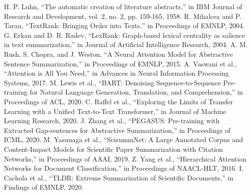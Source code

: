 \documentclass[conference]{IEEEtran}
\begin{document}
\begin{thebibliography}{00}
 H. P. Luhn, ``The automatic creation of literature abstracts,'' in IBM Journal of Research and Development, vol. 2, no. 2, pp. 159-165, 1958.
 R. Mihalcea and P. Tarau, ``TextRank: Bringing Order into Texts,'' in Proceedings of EMNLP, 2004.
 G. Erkan and D. R. Radev, ``LexRank: Graph-based lexical centrality as salience in text summarization,'' in Journal of Artificial Intelligence Research, 2004.
 A. M. Rush, S. Chopra, and J. Weston, ``A Neural Attention Model for Abstractive Sentence Summarization,'' in Proceedings of EMNLP, 2015.
 A. Vaswani et al., ``Attention is All You Need,'' in Advances in Neural Information Processing Systems, 2017.
 M. Lewis et al., ``BART: Denoising Sequence-to-Sequence Pre-training for Natural Language Generation, Translation, and Comprehension,'' in Proceedings of ACL, 2020.
 C. Raffel et al., ``Exploring the Limits of Transfer Learning with a Unified Text-to-Text Transformer,'' in Journal of Machine Learning Research, 2020.
 J. Zhang et al., ``PEGASUS: Pre-training with Extracted Gap-sentences for Abstractive Summarization,'' in Proceedings of ICML, 2020.
 M. Yasunaga et al., ``ScisummNet: A Large Annotated Corpus and Content-Impact Models for Scientific Paper Summarization with Citation Networks,'' in Proceedings of AAAI, 2019.
 Z. Yang et al., ``Hierarchical Attention Networks for Document Classification,'' in Proceedings of NAACL-HLT, 2016.
 I. Cachola et al., ``TLDR: Extreme Summarization of Scientific Documents,'' in Findings of EMNLP, 2020.
\end{thebibliography}
\end{document}
